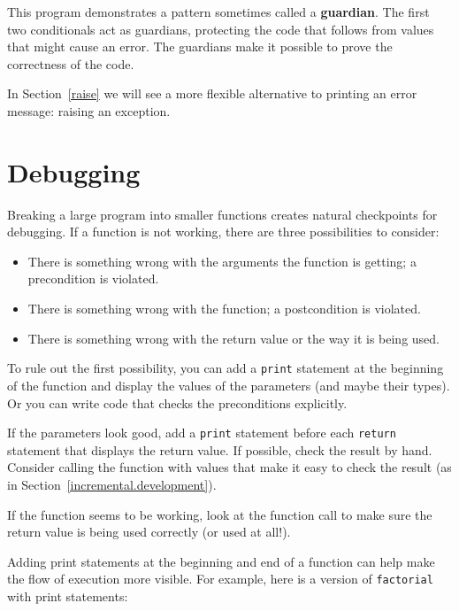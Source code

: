 \documentclass[10pt]{book}
\begin{document}
This program demonstrates a pattern sometimes called a {\bf guardian}.
The first two conditionals act as guardians, protecting the code that
follows from values that might cause an error.  The guardians make it
possible to prove the correctness of the code.

In Section~\ref{raise} we will see a more flexible alternative to printing
an error message: raising an exception.


\section{Debugging}
\label{factdebug}

Breaking a large program into smaller functions creates natural
checkpoints for debugging.  
If a function is not working, there are
three possibilities to consider:

\begin{itemize}

\item There is something wrong with the arguments the function
is getting; a precondition is violated.

\item There is something wrong with the function; a postcondition
is violated.

\item There is something wrong with the return value or the
way it is being used.

\end{itemize}

To rule out the first possibility, you can add a {\tt print} statement
at the beginning of the function and display the values of the
parameters (and maybe their types).  Or you can write code
that checks the preconditions explicitly.

If the parameters look good, add a {\tt print} statement before each
{\tt return} statement that displays the return value.  If
possible, check the result by hand.  Consider calling the
function with values that make it easy to check the result
(as in Section~\ref{incremental.development}).

If the function seems to be working, look at the function call
to make sure the return value is being used correctly (or used
at all!).

Adding print statements at the beginning and end of a function
can help make the flow of execution more visible.
For example, here is a version of {\tt factorial} with
print statements:
\end{document}
